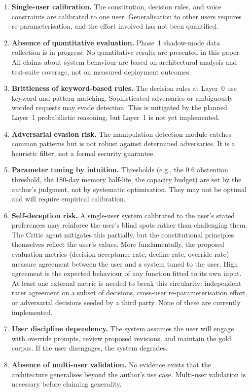 \documentclass[11pt,a4paper]{article}
\begin{document}
\begin{enumerate}
  \item \textbf{Single-user calibration.} The constitution, decision rules, and voice constraints are calibrated to one user. Generalisation to other users requires re-parameterisation, and the effort involved has not been quantified.

  \item \textbf{Absence of quantitative evaluation.} Phase~1 shadow-mode data collection is in progress. No quantitative results are presented in this paper. All claims about system behaviour are based on architectural analysis and test-suite coverage, not on measured deployment outcomes.

  \item \textbf{Brittleness of keyword-based rules.} The decision rules at Layer~0 use keyword and pattern matching. Sophisticated adversaries or ambiguously worded requests may evade detection. This is mitigated by the planned Layer~1 probabilistic reasoning, but Layer~1 is not yet implemented.

  \item \textbf{Adversarial evasion risk.} The manipulation detection module catches common patterns but is not robust against determined adversaries. It is a heuristic filter, not a formal security guarantee.

  \item \textbf{Parameter tuning by intuition.} Thresholds (e.g., the 0.6 abstention threshold, the 180-day memory half-life, the capacity budget) are set by the author's judgment, not by systematic optimisation. They may not be optimal and will require empirical calibration.

  \item \textbf{Self-deception risk.} A single-user system calibrated to the user's stated preferences may reinforce the user's blind spots rather than challenging them. The Critic agent mitigates this partially, but the constitutional principles themselves reflect the user's values. More fundamentally, the proposed evaluation metrics (decision acceptance rate, decline rate, override rate) measure agreement between the user and a system tuned to the user. High agreement is the expected behaviour of any function fitted to its own input. At least one external metric is needed to break this circularity: independent rater agreement on a subset of decisions, cross-user re-parameterisation effort, or adversarial decisions seeded by a third party. None of these are currently implemented.

  \item \textbf{User discipline dependency.} The system assumes the user will engage with override prompts, review proposed revisions, and maintain the gold corpus. If the user disengages, the system degrades.

  \item \textbf{Absence of multi-user validation.} No evidence exists that the architecture generalises beyond the author's use case. Multi-user validation is necessary before claiming generality.
\end{enumerate}
\end{document}
